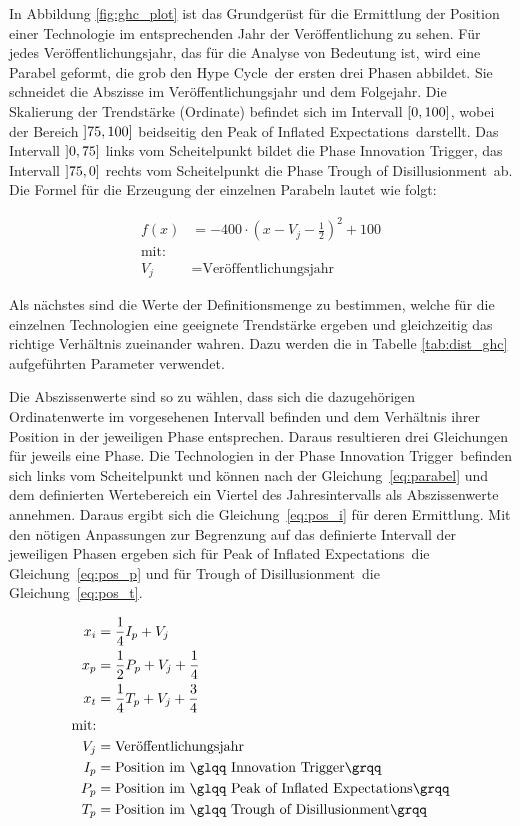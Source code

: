 In Abbildung \ref{fig:ghc_plot} ist das Grundgerüst für die Ermittlung der Position einer Technologie im entsprechenden Jahr der Veröffentlichung zu sehen. Für jedes Veröffentlichungsjahr, das für die Analyse von Bedeutung ist, wird eine Parabel geformt, die grob den \glqq Hype Cycle\grqq~der ersten drei Phasen abbildet. Sie schneidet die Abszisse im Veröffentlichungsjahr und dem Folgejahr. Die Skalierung der Trendstärke (Ordinate) befindet sich im Intervall $\interval{0}{100}$, wobei der Bereich $\interval[open left]{75}{100}$ beidseitig den \glqq Peak of Inflated Expectations\grqq~darstellt. Das Intervall $\interval[open left]{0}{75}$ links vom Scheitelpunkt bildet die Phase \glqq Innovation Trigger\grqq, das Intervall $\interval[open left]{75}{0}$ rechts vom Scheitelpunkt die Phase \glqq Trough of Disillusionment\grqq~ab. Die Formel für die Erzeugung der einzelnen Parabeln lautet wie folgt:

\begin{align}
f(x) &= -400 \cdot \left( x - V_j - \frac{1}{2} \right)^2+100 \label{eq:parabel}\\
\text{mit:}\nonumber\\
V_j &= \text{Veröffentlichungsjahr}\nonumber
\end{align}

Als nächstes sind die Werte der Definitionsmenge zu bestimmen, welche für die einzelnen Technologien eine geeignete Trendstärke ergeben und gleichzeitig das richtige Verhältnis zueinander wahren. Dazu werden die in Tabelle \ref{tab:dist_ghc} aufgeführten Parameter verwendet.

Die Abszissenwerte sind so zu wählen, dass sich die dazugehörigen Ordinatenwerte im vorgesehenen Intervall befinden und dem Verhältnis ihrer Position in der jeweiligen Phase entsprechen. Daraus resultieren drei Gleichungen für jeweils eine Phase. Die Technologien in der Phase \glqq Innovation Trigger\grqq~befinden sich links vom Scheitelpunkt und können nach der Gleichung~\ref{eq:parabel} und dem definierten Wertebereich ein Viertel des Jahresintervalls als Abszissenwerte annehmen. Daraus ergibt sich die Gleichung~\ref{eq:pos_i} für deren Ermittlung. Mit den nötigen Anpassungen zur Begrenzung auf das definierte Intervall der jeweiligen Phasen ergeben sich für \glqq Peak of Inflated Expectations\grqq~die Gleichung~\ref{eq:pos_p} und für \glqq Trough of Disillusionment\grqq~die Gleichung~\ref{eq:pos_t}.

\begin{align}
x_i &= \frac{1}{4}I_p+V_j \label{eq:pos_i}\\
x_p &= \frac{1}{2}P_p+V_j+\frac{1}{4} \label{eq:pos_p}\\
x_t &= \frac{1}{4}T_p+V_j+\frac{3}{4} \label{eq:pos_t}\\
\text{mit:}\nonumber\\
V_j &= \text{Veröffentlichungsjahr}\nonumber\\
I_p &= \text{Position im \glqq Innovation Trigger\grqq}\nonumber\\
P_p &= \text{Position im \glqq Peak of Inflated Expectations\grqq}\nonumber\\
T_p &= \text{Position im \glqq Trough of Disillusionment\grqq}\nonumber
\end{align}

